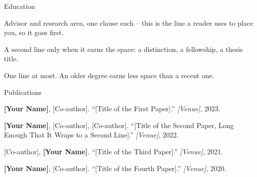 \documentclass[fontset=commercial,pagefooter=false]{yuan2resume}
\begin{document}
\maketitle

\begin{cvtwocolumn}

\begin{cvsection}{Education}
  \begin{cvitemize}
    \item Advisor and research area, one clause each -- this is the line a reader
      uses to place you, so it goes first.
    \item A second line only when it earns the space: a distinction, a
      fellowship, a thesis title.
  \end{cvitemize}
  \cvgap
  \begin{cvitemize}
    \item One line at most. An older degree earns less space than a recent one.
  \end{cvitemize}
\end{cvsection}

\begin{cvsection}{Publications}
  \begin{cvnumlist}
    \item \textbf{[Your Name]}, {[Co-author]}. ``[Title of the First Paper].''
      \textit{[Venue]}, 2023.
    \item \textbf{[Your Name]}, {[Co-author]}, {[Co-author]}. ``[Title of the
      Second Paper, Long Enough That It Wraps to a Second Line].''
      \textit{[Venue]}, 2022.
    \item {[Co-author]}, \textbf{[Your Name]}. ``[Title of the Third Paper].''
      \textit{[Venue]}, 2021.
    \item \textbf{[Your Name]}, {[Co-author]}. ``[Title of the Fourth Paper].''
      \textit{[Venue]}, 2020.
  \end{cvnumlist}
\end{cvsection}


\end{cvtwocolumn}
\end{document}
